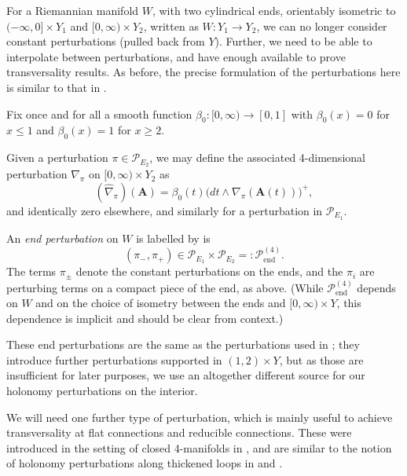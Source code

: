 \documentclass[10pt,a4paper]{amsart}
\theoremstyle{definition}
\theoremstyle{remark}
\numberwithin{figure}{qchap}
\begin{document}
For a Riemannian manifold $W$, with two cylindrical ends, orientably isometric to $(-\infty, 0] \times Y_1$ and $[0,\infty) \times Y_2$, written as $W: Y_1 \to Y_2$, we can no longer consider constant perturbations (pulled back from $Y$). Further, we need to be able to interpolate between perturbations, and have enough available to prove transversality results. As before, the precise formulation of the perturbations here is similar to that in \cite[Section~3.2]{KM1}. 

Fix once and for all a smooth function $\beta_0: [0, \infty) \to [0,1]$ with $\beta_0(x) = 0$ for $x \leq 1$ and $\beta_0(x) = 1$ for $x \geq 2$.

Given a perturbation $\pi \in \mathcal P_{E_2}$, we may define the associated 4-dimensional perturbation $\widehat{\nabla}_{\pi}$ on $[0,\infty) \times Y_2$ as $$(\widehat \nabla_{\pi})(\mathbf{A}) = \beta_0(t)\big(dt \wedge \nabla_{\pi}(\mathbf{A}(t))\big)^+,$$ and identically zero elsewhere, and similarly for a perturbation in $\mathcal P_{E_1}$. 

An \emph{end perturbation} on $W$ is labelled by is $$(\pi_-, \pi_+) \in \mathcal P_{E_1} \times \mathcal P_{E_2} =: \mathcal P^{(4)}_{\text{end}}.$$ The terms $\pi_\pm$ denote the constant perturbations on the ends, and the $\pi_i$ are perturbing terms on a compact piece of the end, as above. (While $\mathcal P^{(4)}_{\text{end}}$ depends on $W$ and on the choice of isometry between the ends and $[0,\infty) \times Y$, this dependence is implicit and should be clear from context.) 

These end perturbations are the same as the perturbations used in \cite{KM1}; they introduce further perturbations supported in $(1,2) \times Y$, but as those are insufficient for later purposes, we use an altogether different source for our holonomy perturbations on the interior. 

We will need one further type of perturbation, which is mainly useful to achieve transversality at flat connections and reducible connections. These were introduced in the setting of closed 4-manifolds in \cite{Kronheimer}, and are similar to the notion of holonomy perturbations along thickened loops in \cite{donaldson1987orientation} and \cite{Fr3}.
\end{document}
